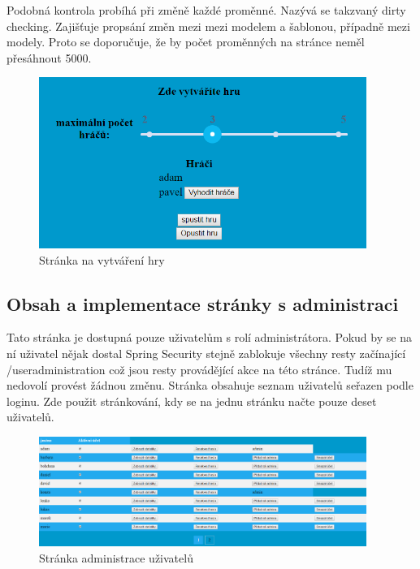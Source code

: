 \documentclass[czech,master,public,dept460,male,cpdeclaration,twoside]{diploma}
\begin{document}
Podobná kontrola probíhá při změně každé proměnné. Nazývá se takzvaný dirty checking. Zajišťuje propsání změn mezi mezi modelem a šablonou, případně mezi modely. Proto se doporučuje, že by počet proměnných na stránce neměl přesáhnout 5000.
\begin{figure}[H]
\centering\includegraphics[width=0.95\textwidth]{Figures/gamecreationpage.png}\caption{Stránka na vytváření hry}
\end{figure}

\subsection{Obsah a implementace stránky s administraci}
Tato stránka je dostupná pouze uživatelům s rolí administrátora. Pokud by se na ní uživatel nějak dostal Spring Security stejně zablokuje všechny resty začínající /useradministration což jsou resty provádějící akce na této stránce. Tudíž mu nedovolí provést žádnou změnu. Stránka obsahuje seznam uživatelů seřazen podle loginu. Zde použit stránkování, kdy se na jednu stránku načte pouze deset uživatelů.

\begin{figure}[H]
\centering\includegraphics[width=0.95\textwidth]{Figures/administrationpage.png}\caption{Stránka administrace uživatelů}
\end{figure}
\end{document}
